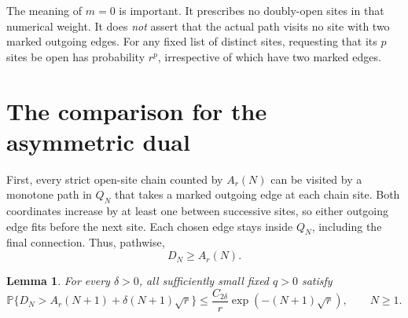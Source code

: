 \documentclass[11pt]{article}
\newtheorem{lemma}{Lemma}
\newcommand{\Prob}{\mathbb P}
\begin{document}
The meaning of $m=0$ is important. It prescribes no doubly-open
sites in that numerical weight. It does \emph{not} assert that the
actual path visits no site with two marked outgoing edges. For any
fixed list of distinct sites, requesting that its $p$ sites be open
has probability $r^p$, irrespective of which have two marked edges.

\section{The comparison for the asymmetric dual}

First, every strict open-site chain counted by $A_r(N)$ can be
visited by a monotone path in $Q_N$ that takes a marked outgoing
edge at each chain site. Both coordinates increase by at least one
between successive sites, so either outgoing edge fits before the
next site. Each chosen edge stays inside $Q_N$, including the final
connection. Thus, pathwise,
\begin{equation}\label{lower}
 D_N\ge A_r(N).
\end{equation}

\begin{lemma}\label{upper}
For every $\delta>0$, all sufficiently small fixed $q>0$ satisfy
\begin{equation}\label{tail}
 \Prob\{D_N>A_r(N+1)+\delta(N+1)\sqrt r\}
 \le \frac{C_{2\delta}}{r}\exp(-(N+1)\sqrt r),
 \qquad N\ge1.
\end{equation}
\end{lemma}
\end{document}
